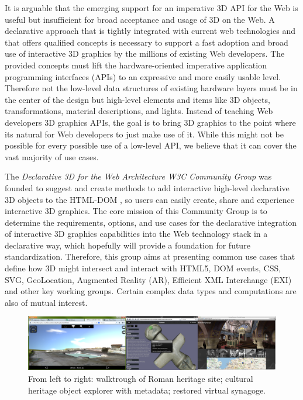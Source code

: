 \documentclass[review]{acmsiggraph}
\begin{document}
It is arguable that the emerging support for an imperative 3D API for the Web is useful but insufficient for broad acceptance and usage of 3D on the Web. A declarative approach that is tightly integrated with current web technologies and that offers qualified concepts is necessary to support a fast adoption and broad use of interactive 3D graphics by the millions of existing Web developers. The provided concepts must lift the hardware-oriented imperative application programming interfaces (APIs) to an expressive and more easily usable level. Therefore not the low-level data structures of existing hardware layers must be in the center of the design but high-level elements and items like 3D objects, transformations, material descriptions, and lights. Instead of teaching Web developers 3D graphics APIs, the goal is to bring 3D graphics to the point where its natural for Web developers to just make use of it. While this might not be possible for every possible use of a low-level API, we believe that it can cover the vast majority of use cases.

The \textit{Declarative 3D for the Web Architecture W3C Community Group} \cite{Dec3D-CG} was founded to suggest and create methods to add interactive high-level declarative 3D objects to the HTML-DOM \cite{W3C-DOM}, so users can easily create, share and experience interactive 3D graphics. The core mission of this Community Group is to determine the requirements, options, and use cases for the declarative integration of interactive 3D graphics capabilities into the Web technology stack in a declarative way, which hopefully will provide a foundation for future standardization.
Therefore, this group aims at presenting common use cases that define how 3D might intersect and interact with HTML5, DOM events, CSS, SVG, GeoLocation, Augmented Reality (AR), Efficient XML Interchange (EXI) and other key working groups. Certain complex data types and computations are also of mutual interest.

\begin{figure}%
  \centering
  \includegraphics[width=1.0\textwidth]{images/ch_apps.png}
  \caption{From left to right: walktrough of Roman heritage site; cultural heritage object explorer with metadata; restored virtual synagoge.}
  \label{fig:chApps}
\end{figure}
\end{document}
